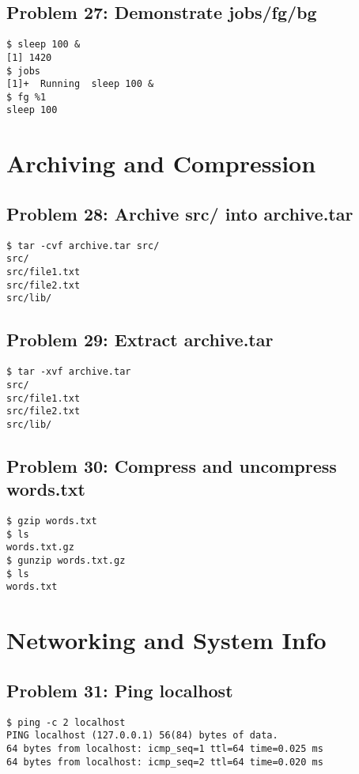 \subsection*{Problem 27: Demonstrate jobs/fg/bg}
\begin{verbatim}
$ sleep 100 &
[1] 1420
$ jobs
[1]+  Running  sleep 100 &
$ fg %1
sleep 100
\end{verbatim}

\section{Archiving and Compression}

\subsection*{Problem 28: Archive src/ into archive.tar}
\begin{verbatim}
$ tar -cvf archive.tar src/
src/
src/file1.txt
src/file2.txt
src/lib/
\end{verbatim}

\subsection*{Problem 29: Extract archive.tar}
\begin{verbatim}
$ tar -xvf archive.tar
src/
src/file1.txt
src/file2.txt
src/lib/
\end{verbatim}

\subsection*{Problem 30: Compress and uncompress words.txt}
\begin{verbatim}
$ gzip words.txt
$ ls
words.txt.gz
$ gunzip words.txt.gz
$ ls
words.txt
\end{verbatim}

\section{Networking and System Info}

\subsection*{Problem 31: Ping localhost}
\begin{verbatim}
$ ping -c 2 localhost
PING localhost (127.0.0.1) 56(84) bytes of data.
64 bytes from localhost: icmp_seq=1 ttl=64 time=0.025 ms
64 bytes from localhost: icmp_seq=2 ttl=64 time=0.020 ms
\end{verbatim}

